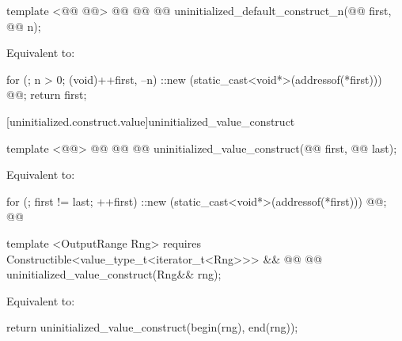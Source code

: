 \begin{codeblock}
  template <@@ @@>
    @@
             @@
  @@
    uninitialized_default_construct_n(@@ first, @@ n);
\end{codeblock}

\pnum
\effects Equivalent to:
\begin{codeblock}
        for (; n > 0; (void)++first, --n)
          ::new (static_cast<void*>(addressof(*first)))
            @@;
        return first;
\end{codeblock}

[uninitialized.construct.value]{uninitialized_value_construct}
\begin{codeblock}
  template <@@>
    @@
             @@
    @@ uninitialized_value_construct(@@ first, @@ last);
\end{codeblock}


\setcounter{Paras}{0}
\effects Equivalent to:
\begin{codeblock}
        for (; first != last; ++first)
          ::new (static_cast<void*>(addressof(*first)))
            @@;
        @@
\end{codeblock}
{\color{addclr}
\begin{codeblock}
  template <OutputRange Rng>
    requires Constructible<value_type_t<iterator_t<Rng>>> &&
             @@
  @@ uninitialized_value_construct(Rng&& rng);
\end{codeblock}

\pnum
\effects Equivalent to:
\begin{codeblock}
      return uninitialized_value_construct(begin(rng), end(rng));
\end{codeblock}
} %

